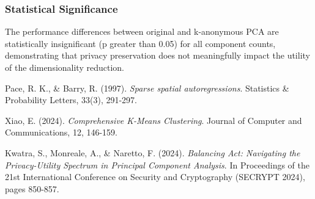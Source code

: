 \documentclass[a4paper, 11pt]{article}
\begin{document}
\subsubsection{Statistical Significance}
The performance differences between original and k-anonymous PCA are statistically insignificant (p greater than 0.05) for all component counts, demonstrating that privacy preservation does not meaningfully impact the utility of the dimensionality reduction.


\begin{thebibliography}{9}
Pace, R. K., \& Barry, R. (1997).
\textit{Sparse spatial autoregressions}.
Statistics \& Probability Letters, 33(3), 291-297.

Xiao, E. (2024).
\textit{Comprehensive K-Means Clustering}.
Journal of Computer and Communications, 12, 146-159.

Kwatra, S., Monreale, A., \& Naretto, F. (2024).
\textit{Balancing Act: Navigating the Privacy-Utility Spectrum in Principal Component Analysis}.
In Proceedings of the 21st International Conference on Security and Cryptography (SECRYPT 2024), pages 850-857.
\end{thebibliography}
\end{document}
